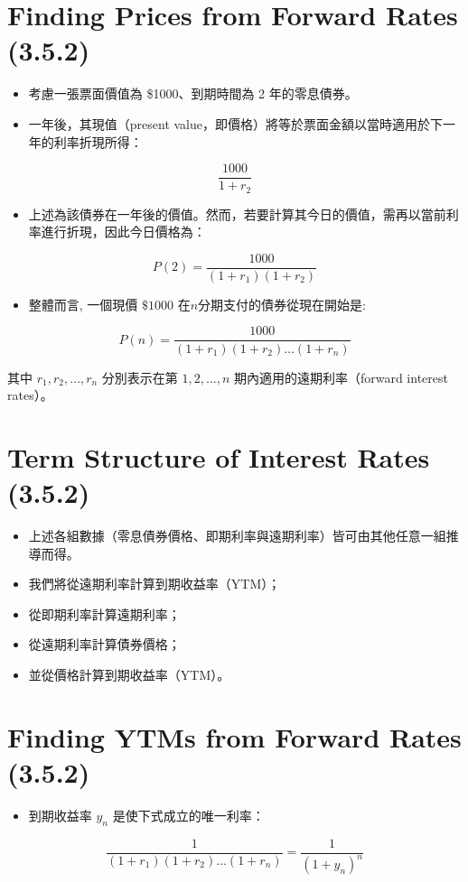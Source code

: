 \documentclass[letterpaper]{article}
\begin{document}
\section*{Finding Prices from Forward Rates (3.5.2)}
\begin{itemize}
	\item 考慮一張票面價值為 \$1000、到期時間為 2 年的零息債券。
	\item 一年後，其現值（present value，即價格）將等於票面金額以當時適用於下一年的利率折現所得：
\end{itemize}


$$
\frac{1000}{1+r_{2}}
$$

\begin{itemize}
	\item 上述為該債券在一年後的價值。然而，若要計算其今日的價值，需再以當前利率進行折現，因此今日價格為：
\end{itemize}

$$
P(2)=\frac{1000}{\left(1+r_{1}\right)\left(1+r_{2}\right)}
$$

\begin{itemize}
  \item 整體而言, 一個現價 $\$ 1000$ 在$n$分期支付的債券從現在開始是:
\end{itemize}

$$
P(n)=\frac{1000}{\left(1+r_{1}\right)\left(1+r_{2}\right) \ldots\left(1+r_{n}\right)}
$$

其中 \( r_{1}, r_{2}, \ldots, r_{n} \) 分別表示在第 \(1, 2, \ldots, n\) 期內適用的遠期利率（forward interest rates）。


\section*{Term Structure of Interest Rates (3.5.2)}
\begin{itemize}
	\item 上述各組數據（零息債券價格、即期利率與遠期利率）皆可由其他任意一組推導而得。
	\item 我們將從遠期利率計算到期收益率（YTM）；
	\item 從即期利率計算遠期利率；
	\item 從遠期利率計算債券價格；
	\item 並從價格計算到期收益率（YTM）。
\end{itemize}


\section*{Finding YTMs from Forward Rates (3.5.2)}
\begin{itemize}
	\item 到期收益率 \( y_{n} \) 是使下式成立的唯一利率：
\end{itemize}
$$
\frac{1}{\left(1+r_{1}\right)\left(1+r_{2}\right) \ldots\left(1+r_{n}\right)}=\frac{1}{\left(1+y_{n}\right)^{n}}
$$
\end{document}
